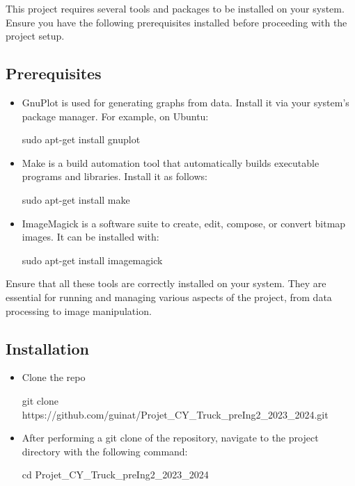 \documentclass[11pt]{article}
\begin{document}
This project requires several tools and packages to be installed on your system. Ensure you have the following prerequisites installed before proceeding with the project setup.

\subsection{Prerequisites}

\begin{itemize}
    \item GnuPlot is used for generating graphs from data. Install it via your system's package manager. For example, on Ubuntu:
          \begin{mycode}
              sudo apt-get install gnuplot
          \end{mycode}

    \item Make is a build automation tool that automatically builds executable programs and libraries. Install it as follows:
          \begin{mycode}
              sudo apt-get install make
          \end{mycode}

    \item ImageMagick is a software suite to create, edit, compose, or convert bitmap images. It can be installed with:
          \begin{mycode}
              sudo apt-get install imagemagick
          \end{mycode}
\end{itemize}
Ensure that all these tools are correctly installed on your system. They are essential for running and managing various aspects of the project, from data processing to image manipulation.

\subsection{Installation}

\begin{itemize}
    \item Clone the repo
          \begin{mycode}
              git clone https://github.com/guinat/Projet\_CY\_Truck\_preIng2\_2023\_2024.git
          \end{mycode}


    \item After performing a git clone of the repository, navigate to the project directory with the following command:
          \begin{mycode}
              cd Projet\_CY\_Truck\_preIng2\_2023\_2024
          \end{mycode}
\end{itemize}
\end{document}
